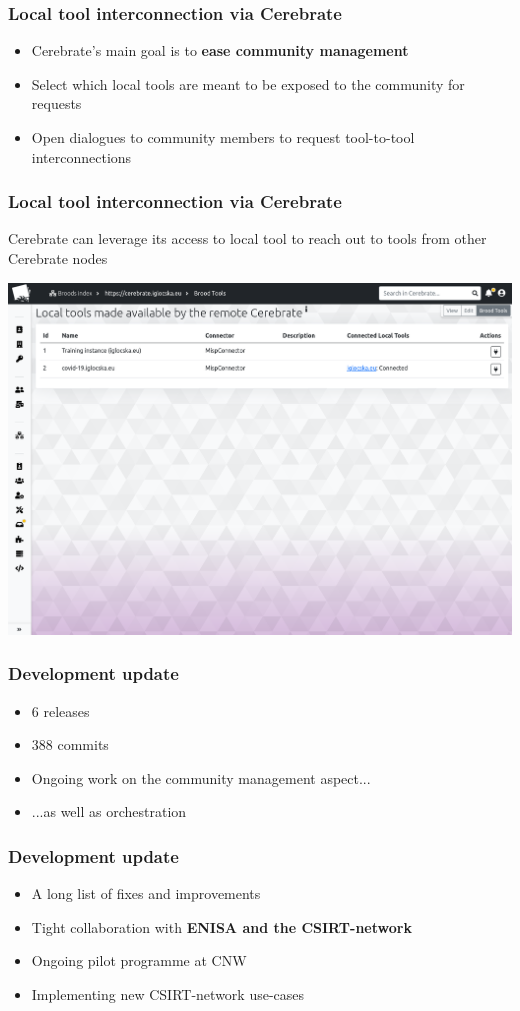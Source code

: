 \begin{frame}
\frametitle{Local tool interconnection via Cerebrate}
    \begin{itemize}
        \item Cerebrate's main goal is to \textbf{ease community management}
        \item Select which local tools are meant to be exposed to the community for requests
        \item Open dialogues to community members to request tool-to-tool interconnections
    \end{itemize}
\end{frame}

\begin{frame}
\frametitle{Local tool interconnection via Cerebrate}
    Cerebrate can leverage its access to local tool to reach out to tools from other Cerebrate nodes
    \begin{center}
        \includegraphics[width=0.85\linewidth]{pictures/tools-made-available.png}
    \end{center}
\end{frame}

\begin{frame}
\frametitle{Development update}
    \begin{itemize}
        \item 6 releases
        \item 388 commits
        \item Ongoing work on the community management aspect...
        \item ...as well as orchestration
    \end{itemize}
\end{frame}

\begin{frame}
\frametitle{Development update}
    \begin{itemize}
        \item A long list of fixes and improvements
        \item Tight collaboration with {\bf ENISA and the CSIRT-network}
        \item Ongoing pilot programme at CNW
        \item Implementing new CSIRT-network use-cases
    \end{itemize}
\end{frame}

